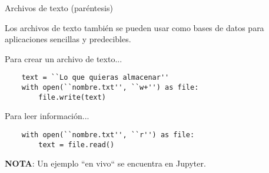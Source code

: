 \begin{frame}[fragile]{Archivos de texto (paréntesis)}\vspace{10pt}

Los archivos de texto también se pueden usar como bases de datos para aplicaciones sencillas y predecibles.

Para crear un archivo de texto...

\begin{center}
\begin{lstlisting}
	text = ``Lo que quieras almacenar''
	with open(``nombre.txt'', ``w+'') as file:
		file.write(text)
\end{lstlisting}
\end{center}

Para leer información...

\begin{center}
\begin{lstlisting}
	with open(``nombre.txt'', ``r'') as file:
		text = file.read()
\end{lstlisting}
\end{center}

\vspace{5pt}

\textbf{NOTA}: Un ejemplo ``en vivo`` se encuentra en Jupyter.

\end{frame}
